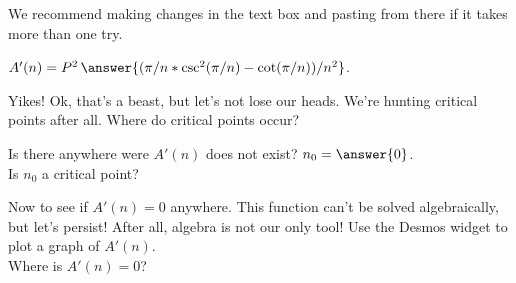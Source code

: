 \documentclass[handout,nooutcomes]{ximera}
\begin{document}
\begin{freeResponse}
We recommend making changes in the text box and pasting from there if it takes more than one try.
\end{freeResponse}
$A'(n) = P^2\,\answer{(\pi/n*\csc^2(\pi/n)-\cot(\pi/n))/n^2}$.\\

\bigskip

\hspace{2cm}Yikes! Ok, that's a beast, but let's not lose our heads. We're hunting critical points after all. Where do critical points occur?\\
\begin{selectAll}
\end{selectAll}
Is there anywhere were $A'(n)$ does not exist? $n_0 = \answer{0}$.\\
Is $n_0$ a critical point?\\
\begin{multipleChoice}
\end{multipleChoice}

\bigskip

\hspace{2cm}Now to see if $A'(n)=0$ anywhere. This function can't be solved algebraically, but let's persist! After all, algebra is not our only tool! Use the Desmos widget to plot a graph of $A'(n)$.\\
\graph[panel]{}
Where is $A'(n)=0$?\\
\begin{multipleChoice}
\end{multipleChoice}

\bigskip
\end{document}
